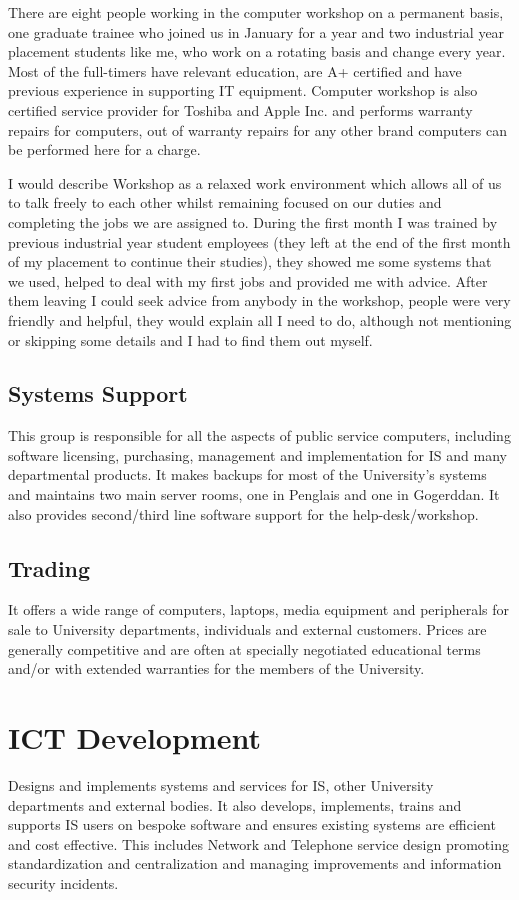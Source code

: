 \documentclass[10pt,a4paper,headinclude=true,twoside]{report}
\begin{document}
There are eight people working in the computer workshop on a permanent basis, one graduate trainee who joined us in January for a year and two industrial year placement students like me, who work on a rotating basis and change every year. Most of the full-timers have relevant education, are A+ certified\cite{A+} and have previous experience in supporting IT equipment. Computer workshop is also certified service provider for Toshiba and Apple Inc. and performs warranty repairs for computers, out of warranty repairs for any other brand computers can be performed here for a charge. 

I would describe Workshop as a relaxed work environment which allows all of us to talk freely to each other whilst remaining focused on our duties and completing the jobs we are assigned to. During the first month I was trained by previous industrial year student employees (they left at the end of the first month of my placement to continue their studies), they showed me some systems that we used, helped to deal with my first jobs and provided me with advice. After them leaving I could seek advice from anybody in the workshop, people were very friendly and helpful, they would explain all I need to do, although not mentioning or skipping some details and I had to find them out myself.
\subsection{Systems Support}
This group is responsible for all the aspects of public service computers, including software licensing, purchasing, management and implementation for IS and many departmental products. It makes backups for most of the University's systems and maintains two main server rooms, one in Penglais and one in Gogerddan. It also provides second/third line software support for the help-desk/workshop.\cite{InternalTeamdescription}
\subsection{Trading}
It offers a wide range of computers, laptops, media equipment and peripherals for sale to University departments, individuals and external customers. Prices are generally competitive and are often at specially negotiated educational terms and/or with extended warranties for the members of the University.\cite{InternalTeamdescription}
\section{ICT Development}
Designs and implements systems and services for IS, other University departments and external bodies. It also develops, implements, trains and supports IS users on bespoke software and ensures existing systems are efficient and cost effective. This includes Network and Telephone service design promoting standardization and centralization and managing improvements and information security incidents.\cite{InternalTeamdescription}
\end{document}
